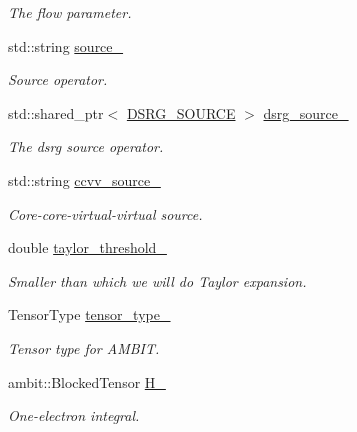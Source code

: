 \begin{DoxyCompactItemize}
\begin{DoxyCompactList}\small\item\em The flow parameter. \end{DoxyCompactList}\item 
std\+::string \mbox{\hyperlink{classforte_1_1_d_s_r_g___m_r_p_t_a00fe6c6a209483b46105796c0c3b2ee6}{source\+\_\+}}
\begin{DoxyCompactList}\small\item\em Source operator. \end{DoxyCompactList}\item 
std\+::shared\+\_\+ptr$<$ \mbox{\hyperlink{classforte_1_1_d_s_r_g___s_o_u_r_c_e}{D\+S\+R\+G\+\_\+\+S\+O\+U\+R\+CE}} $>$ \mbox{\hyperlink{classforte_1_1_d_s_r_g___m_r_p_t_a81c8ed2fc9fc2cba6888cd3552ce9c9d}{dsrg\+\_\+source\+\_\+}}
\begin{DoxyCompactList}\small\item\em The dsrg source operator. \end{DoxyCompactList}\item 
std\+::string \mbox{\hyperlink{classforte_1_1_d_s_r_g___m_r_p_t_af42019d1db99243cdf9b02c84a0d8468}{ccvv\+\_\+source\+\_\+}}
\begin{DoxyCompactList}\small\item\em Core-\/core-\/virtual-\/virtual source. \end{DoxyCompactList}\item 
double \mbox{\hyperlink{classforte_1_1_d_s_r_g___m_r_p_t_a979497f0b8e398a9855235a53b8c3939}{taylor\+\_\+threshold\+\_\+}}
\begin{DoxyCompactList}\small\item\em Smaller than which we will do Taylor expansion. \end{DoxyCompactList}\item 
Tensor\+Type \mbox{\hyperlink{classforte_1_1_d_s_r_g___m_r_p_t_ad30b77cfa8e9d11902e8a420d82ae8cb}{tensor\+\_\+type\+\_\+}}
\begin{DoxyCompactList}\small\item\em Tensor type for A\+M\+B\+IT. \end{DoxyCompactList}\item 
ambit\+::\+Blocked\+Tensor \mbox{\hyperlink{classforte_1_1_d_s_r_g___m_r_p_t_a0d207145a8522c1ffef9734288016a39}{H\+\_\+}}
\begin{DoxyCompactList}\small\item\em One-\/electron integral. \end{DoxyCompactList}\item 

\end{DoxyCompactItemize}
